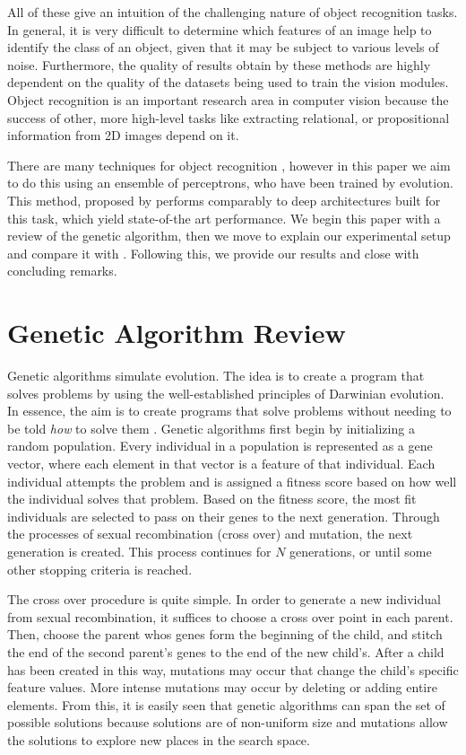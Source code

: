 \documentclass[conference]{IEEEtran}
\begin{document}
All of these give an intuition of the challenging nature of object recognition tasks. In general, it is very difficult to determine which features of an image help to identify the class of an object, given that it may be subject to various levels of noise. Furthermore, the quality of results obtain by these methods are highly dependent on the quality of the datasets being used to train the vision modules. Object recognition is an important research area in computer vision because the success of other, more high-level tasks like extracting relational, or propositional information from 2D images depend on it.

There are many techniques for object recognition \cite{sukanya2016survey}, however in this paper we aim to do this using an ensemble of perceptrons, who have been trained by evolution. This method, proposed by \cite{lillywhite2013feature} performs comparably to deep architectures built for this task, which yield state-of-the art performance. We begin this paper with a review of the genetic algorithm, then we move to explain our experimental setup and compare it with \cite{lillywhite2013feature}. Following this, we provide our results and close with concluding remarks. 
\section{Genetic Algorithm Review}
Genetic algorithms simulate evolution. The idea is to create a program that solves problems by using the well-established principles of Darwinian evolution. In essence, the aim is to create programs that solve problems without needing to be told {\it how} to solve them \cite{koza1992genetic}. Genetic algorithms first begin by initializing a random population. Every individual in a population is represented as a gene vector, where each element in that vector is a feature of that individual. Each individual attempts the problem and is assigned a fitness score based on how well the individual solves that problem. Based on the fitness score, the most fit individuals are selected to pass on their genes to the next generation. Through the processes of sexual recombination (cross over) and mutation, the next generation is created. This process continues for $N$ generations, or until some other stopping criteria is reached.

The cross over procedure is quite simple. In order to generate a new individual from sexual recombination, it suffices to choose a cross over point in each parent. Then, choose the parent whos genes form the beginning of the child, and stitch the end of the second parent's genes to the end of the new child's. After a child has been created in this way, mutations may occur that change the child's specific feature values. More intense mutations may occur by deleting or adding entire elements. From this, it is easily seen that genetic algorithms can span the set of possible solutions because solutions are of non-uniform size and mutations allow the solutions to explore new places in the search space.
\end{document}
